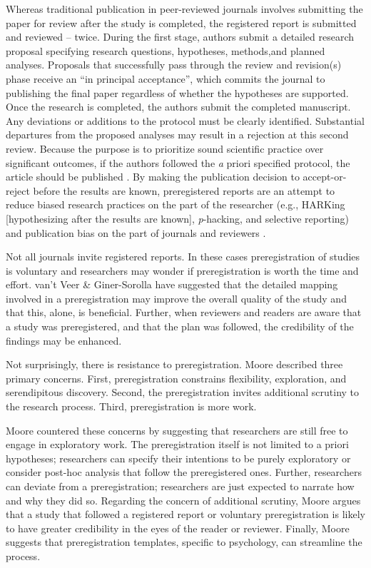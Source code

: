 \documentclass[
  11pt,
]{book}
\begin{document}
Whereas traditional publication in peer-reviewed journals involves submitting the paper for review after the study is completed, the registered report is submitted and reviewed -- twice. During the first stage, authors submit a detailed research proposal specifying research questions, hypotheses, methods,and planned analyses. Proposals that successfully pass through the review and revision(s) phase receive an ``in principal acceptance'', which commits the journal to publishing the final paper regardless of whether the hypotheses are supported. Once the research is completed, the authors submit the completed manuscript. Any deviations or additions to the protocol must be clearly identified. Substantial departures from the proposed analyses may result in a rejection at this second review. Because the purpose is to prioritize sound scientific practice over significant outcomes, if the authors followed the \emph{a} priori specified protocol, the article should be published \citep{chambers_past_2022}. By making the publication decision to accept-or-reject before the results are known, preregistered reports are an attempt to reduce biased research practices on the part of the researcher (e.g., HARKing {[}hypothesizing after the results are known{]}, \emph{p}-hacking, and selective reporting) and publication bias on the part of journals and reviewers \citep{chambers_past_2022, vantveer_pre-registration_2016}.

Not all journals invite registered reports. In these cases preregistration of studies is voluntary and researchers may wonder if preregistration is worth the time and effort. van't Veer \& Giner-Sorolla \citeyearpar{vantveer_pre-registration_2016} have suggested that the detailed mapping involved in a preregistration may improve the overall quality of the study and that this, alone, is beneficial. Further, when reviewers and readers are aware that a study was preregistered, and that the plan was followed, the credibility of the findings may be enhanced.

Not surprisingly, there is resistance to preregistration. Moore \citeyearpar{moore_preregister_2016} described three primary concerns. First, preregistration constrains flexibility, exploration, and serendipitous discovery. Second, the preregistration invites additional scrutiny to the research process. Third, preregistration is more work.

Moore \citeyearpar{moore_preregister_2016} countered these concerns by suggesting that researchers are still free to engage in exploratory work. The preregistration itself is not limited to a priori hypotheses; researchers can specify their intentions to be purely exploratory or consider post-hoc analysis that follow the preregistered ones. Further, researchers can deviate from a preregistration; researchers are just expected to narrate how and why they did so. Regarding the concern of additional scrutiny, Moore argues that a study that followed a registered report or voluntary preregistration is likely to have greater credibility in the eyes of the reader or reviewer. Finally, Moore suggests that preregistration templates, specific to psychology, can streamline the process.
\end{document}
